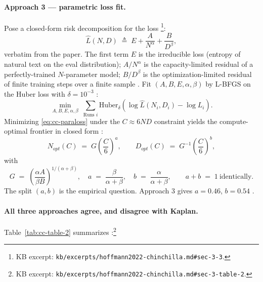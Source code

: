 \paragraph{Approach 3 --- parametric loss fit.}
Pose a closed-form risk decomposition for the loss
\citep[\S 3.3, eq.\ 2]{hoffmann2022-chinchilla}\footnote{KB excerpt:
\texttt{kb/excerpts/hoffmann2022-chinchilla.md\#sec-3-3}.}:
\begin{equation}
\hat{L}(N, D) \;\triangleq\; E + \frac{A}{N^{\alpha}} + \frac{B}{D^{\beta}},
\label{eq:cc-paraloss}
\tag{2}
\end{equation}
verbatim from the paper. The first term $E$ is the irreducible loss
(entropy of natural text on the eval distribution); $A/N^{\alpha}$ is
the capacity-limited residual of a perfectly-trained $N$-parameter
model; $B/D^{\beta}$ is the optimization-limited residual of finite
training steps over a finite sample
\citep[\S 3.3]{hoffmann2022-chinchilla}. Fit $(A, B, E, \alpha, \beta)$
by L-BFGS on the Huber loss with $\delta = 10^{-3}$
\citep[\S 3.3, eq.\ 3]{hoffmann2022-chinchilla}:
\begin{equation}
\min_{A,B,E,\alpha,\beta} \;\sum_{\text{Runs } i}
   \mathrm{Huber}_\delta\!\left(\log \hat{L}(N_i, D_i) - \log L_i\right).
\label{eq:cc-fit}
\tag{3}
\end{equation}
Minimizing \cref{eq:cc-paraloss} under the $C \approx 6 N D$
constraint yields the compute-optimal frontier in closed form
\citep[\S 3.3, eq.\ 4]{hoffmann2022-chinchilla}:
\begin{equation}
N_{opt}(C) \;=\; G \!\left(\frac{C}{6}\right)^{a}, \qquad
D_{opt}(C) \;=\; G^{-1}\!\left(\frac{C}{6}\right)^{b},
\label{eq:cc-frontier}
\tag{4}
\end{equation}
with
\begin{equation}
G \;=\; \left(\frac{\alpha A}{\beta B}\right)^{\!1/(\alpha + \beta)},
\quad a \;=\; \frac{\beta}{\alpha + \beta}, \quad
b \;=\; \frac{\alpha}{\alpha + \beta},
\qquad a + b \;=\; 1\ \text{identically.}
\label{eq:cc-abG}
\end{equation}
The split $(a, b)$ is the empirical question. Approach 3 gives
$a = 0.46$, $b = 0.54$ \citep[\S 3.3]{hoffmann2022-chinchilla}.

\paragraph{All three approaches agree, and disagree with Kaplan.}
Table~\ref{tab:cc-table-2} summarizes
\citep[\S 3, Table 2]{hoffmann2022-chinchilla}:\footnote{KB excerpt:
\texttt{kb/excerpts/hoffmann2022-chinchilla.md\#sec-3-table-2}.}


